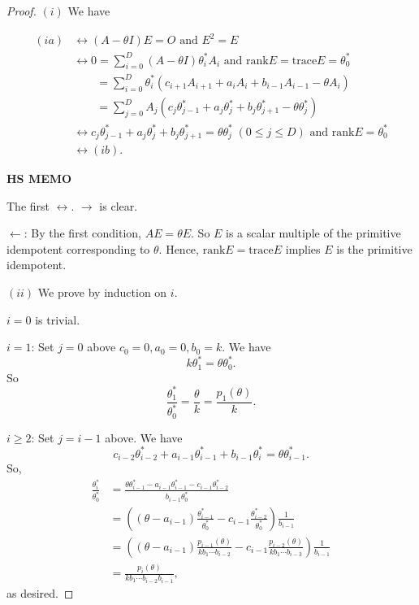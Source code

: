 \documentclass[
]{book}
\theoremstyle{definition}
\theoremstyle{definition}
\theoremstyle{definition}
\theoremstyle{definition}
\theoremstyle{remark}
\begin{document}
\begin{proof}
\leavevmode

\((i)\) We have

\begin{align}
(ia) & \leftrightarrow (A- \theta I)E = O \text{ and } E^2 = E\\
& \leftrightarrow 0 = \sum_{i=0}^D(A-\theta I)\theta^*_i A_i \text{ and $\mathrm{rank}E = \mathrm{trace}E = \theta^*_0$}\\
& \qquad = \sum_{i=0}^D\theta^*_i(c_{i+1}A_{i+1}+ a_iA_i + b_{i-1}A_{i-1}-\theta A_i)\\
& \qquad = \sum_{j=0}^D A_j(c_j\theta^*_{j-1}+a_j\theta^*_j+b_j\theta^*_{j+1}-\theta \theta^*_j)\\
& \leftrightarrow c_j \theta^*_{j-1} + a_j\theta^*_j + b_j\theta^*_{j+1} = \theta \theta^*_j \; (0\leq j \leq D) \text{ and }\mathrm{rank}E = \theta^*_0\\
& \leftrightarrow (ib).
\end{align}

\textbf{HS MEMO}

The first \(\leftrightarrow\). \(\rightarrow\) is clear.

\(\leftarrow\): By the first condition, \(AE = \theta E\). So \(E\) is a scalar multiple of the primitive idempotent corresponding to \(\theta\). Hence, \(\mathrm{rank}E = \mathrm{trace}E\) implies \(E\) is the primitive idempotent.

\((ii)\) We prove by induction on \(i\).

\(i = 0\) is trivial.

\(i=1\): Set \(j = 0\) above \(c_0 = 0, a_0 = 0, b_0 = k\). We have
\[k\theta^*_1 = \theta \theta^*_0.\]
So
\[\frac{\theta^*_1}{\theta^*_0} = \frac{\theta}{k} = \frac{p_1(\theta)}{k}.\]

\(i\geq 2\): Set \(j=i-1\) above. We have
\[c_{i-2}\theta^*_{i-2} + a_{i-1}\theta^*_{i-1} + b_{i-1}\theta^*_i = \theta \theta^*_{i-1}.\]
So,
\begin{align}
\frac{\theta^*_i}{\theta^*_0} & = \frac{\theta\theta^*_{i-1}-a_{i-1}\theta^*_{i-1}-c_{i-1}\theta^*_{i-2}}{b_{i-1}\theta^*_0}\\
& = \left((\theta-a_{i-1})\frac{\theta^*_{i-1}}{\theta^*_0}-c_{i-1}\frac{\theta^*_{i-2}}{\theta^*_0}\right)\frac{1}{b_{i-1}}\\
& = \left((\theta-a_{i-1})\frac{p_{i-1}(\theta)}{kb_1\cdots b_{i-2}}-c_{i-1}\frac{p_{i-2}(\theta)}{kb_1\cdots b_{i-3}}\right)\frac{1}{b_{i-1}}\\
& = \frac{p_i(\theta)}{kb_1\cdots b_{i-2}b_{i-1}},
\end{align}
as desired.

\end{proof}
\end{document}
